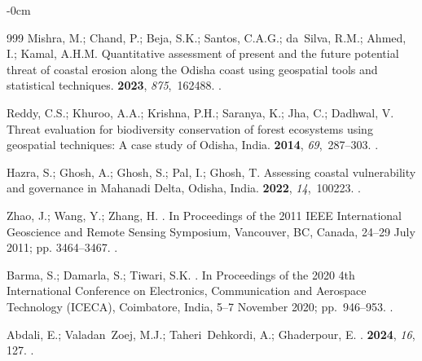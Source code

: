 \documentclass[jmse,article,accept,pdftex,oneauthor]{Definitions/mdpi}
\begin{document}
\begin{adjustwidth}{-\extralength}{0cm}
\begin{thebibliography}{999}
Mishra, M.; Chand, P.; Beja, S.K.; Santos, C.A.G.; da~Silva, R.M.; Ahmed, I.;
  Kamal, A.H.M.
\newblock Quantitative assessment of present and the future potential threat of
  coastal erosion along the Odisha coast using geospatial tools and statistical
  techniques.
 {\bf 2023}, {\em 875},~162488.
.

Reddy, C.S.; Khuroo, A.A.; Krishna, P.H.; Saranya, K.; Jha, C.; Dadhwal, V.
\newblock Threat evaluation for biodiversity conservation of forest ecosystems
  using geospatial techniques: A case study of Odisha, India.
 {\bf 2014}, {\em 69},~287--303.
.

Hazra, S.; Ghosh, A.; Ghosh, S.; Pal, I.; Ghosh, T.
\newblock Assessing coastal vulnerability and governance in Mahanadi Delta,
  Odisha, India.
 {\bf 2022}, {\em 14},~100223.
.

Zhao, J.; Wang, Y.; Zhang, H.
.
\newblock In Proceedings of the 2011 IEEE International Geoscience and Remote
  Sensing Symposium, {Vancouver, BC, Canada, 24--29 July} %
 2011; pp. 3464--3467.
.

Barma, S.; Damarla, S.; Tiwari, S.K.
.
\newblock In Proceedings of the 2020 4th International Conference on
  Electronics, Communication and Aerospace Technology (ICECA), {Coimbatore, India, 5--7 November } 2020; pp.~946--953.
.

Abdali, E.; Valadan~Zoej, M.J.; Taheri~Dehkordi, A.; Ghaderpour, E.
.
 {\bf 2024}, {\em 16}, {127.}  
.


\end{thebibliography}
\end{adjustwidth}
\end{document}
